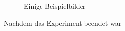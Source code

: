 \begin{figure}[]
{      \label{img:experiment04}
    }
  \caption{Einige Beispielbilder}
\end{figure}
Nachdem das Experiment beendet war



